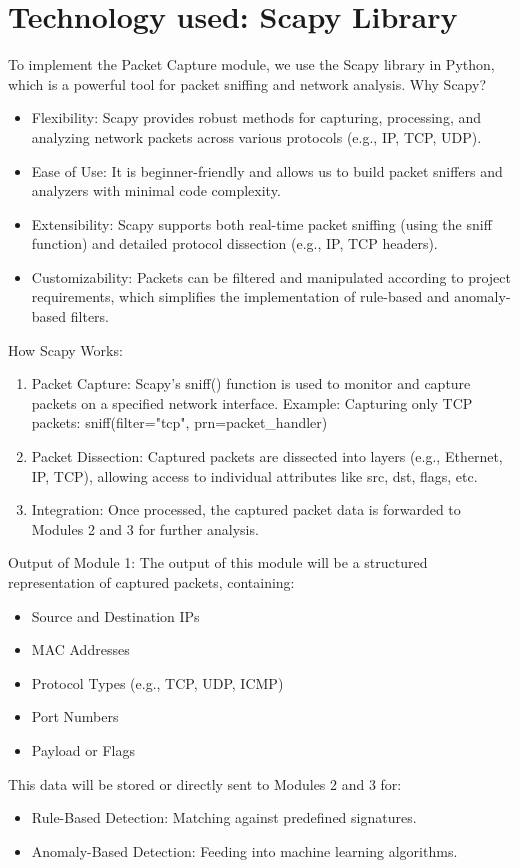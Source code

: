 \documentclass[oneside, english]{reports/assets/sdqtechreport}
\begin{document}
\section{Technology used: Scapy Library}
\label{sec:ScapyLibrary}
To implement the Packet Capture module, we use the Scapy library in Python, which is a powerful tool for packet sniffing and network analysis.
Why Scapy?
\begin{itemize}
	\item Flexibility: Scapy provides robust methods for capturing, processing, and analyzing network packets across various protocols (e.g., IP, TCP, UDP).
	\item Ease of Use: It is beginner-friendly and allows us to build packet sniffers and analyzers with minimal code complexity.
	\item Extensibility: Scapy supports both real-time packet sniffing (using the sniff function) and detailed protocol dissection (e.g., IP, TCP headers).
	\item Customizability: Packets can be filtered and manipulated according to project requirements, which simplifies the implementation of rule-based and anomaly-based filters.
\end{itemize}
How Scapy Works:
\begin{enumerate}
	\item Packet Capture:
   	Scapy's sniff() function is used to monitor and capture packets on a specified network interface.
   	Example: Capturing only TCP packets:
    sniff(filter="tcp", prn=packet\_handler)
	\item Packet Dissection:
   	Captured packets are dissected into layers (e.g., Ethernet, IP, TCP), allowing access to individual attributes like src, dst, flags, etc.
	\item Integration:
   	Once processed, the captured packet data is forwarded to Modules 2 and 3 for further analysis.
\end{enumerate}
Output of Module 1:
The output of this module will be a structured representation of captured packets, containing:
\begin{itemize}
	\item Source and Destination IPs
	\item MAC Addresses
	\item Protocol Types (e.g., TCP, UDP, ICMP)
	\item Port Numbers
	\item Payload or Flags
\end{itemize}
This data will be stored or directly sent to Modules 2 and 3 for:
\begin{itemize}
	\item Rule-Based Detection: Matching against predefined signatures.
	\item Anomaly-Based Detection: Feeding into machine learning algorithms.
\end{itemize}
\end{document}
